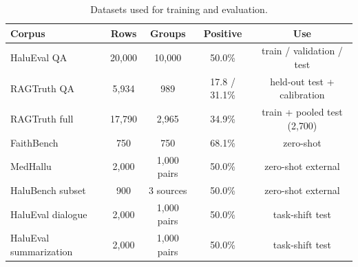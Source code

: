\documentclass[a4paper,fleqn]{cas-sc}
\begin{document}
\begin{table}[pos=htbp]
  \centering
  \caption{Datasets used for training and evaluation.}
  \label{tab:datasets}
  \begin{tabular}{lcccc}
    \toprule
    \textbf{Corpus}        & \textbf{Rows} & \textbf{Groups} & \textbf{Positive} & \textbf{Use}                  \\
    \midrule
    HaluEval QA            & 20{,}000      & 10{,}000        & 50.0\%            & train / validation / test     \\
    RAGTruth QA            & 5{,}934       & 989             & 17.8 / 31.1\%     & held-out test + calibration   \\
    RAGTruth full          & 17{,}790      & 2{,}965         & 34.9\%            & train + pooled test (2{,}700) \\
    FaithBench             & 750           & 750             & 68.1\%            & zero-shot                     \\
    MedHallu               & 2{,}000       & 1{,}000 pairs   & 50.0\%            & zero-shot external            \\
    HaluBench subset       & 900           & 3 sources       & 50.0\%            & zero-shot external            \\
    HaluEval dialogue      & 2{,}000       & 1{,}000 pairs   & 50.0\%            & task-shift test               \\
    HaluEval summarization & 2{,}000       & 1{,}000 pairs   & 50.0\%            & task-shift test               \\
    \bottomrule
  \end{tabular}
\end{table}
\end{document}
